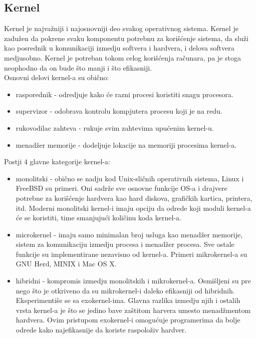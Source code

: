 \subsection{Kernel}
Kernel je najvažniji i najosnovniji deo svakog operativnog sistema. Kernel je zadužen da pokrene svaku komponentu potrebnu za korišćenje sistema, da služi kao posrednik u komunikaciji izmedju softvera i hardvera, i delova softvera medjusobno. Kernel je potreban tokom celog korišćenja računara, pa je stoga neophodno da on bude što manji i što efikasniji.\\
Osnovni delovi kernel-a su obično:
\begin{itemize}
\item rasporednik - odredjuje kako će razni procesi koristiti snagu procesora.
\item supervizor - odobrava kontrolu kompjutera procesu koji je na redu.
\item rukovodilac zahteva - rukuje svim zahtevima upućenim kernel-u.
\item menadžer memorije - dodeljuje lokacije na memoriji procesima kernel-a.
\end{itemize}
Postji 4 glavne kategorije kernel-a:
\begin{itemize}
\item monolitski - obično se nadju kod Unix-sličnih operativnih sistema, Linux i FreeBSD su primeri. Oni sadrže sve osnovne funkcije OS-a i drajvere potrebne za korišćenje hardvera kao hard diskova, grafičkih kartica, printera, itd. Moderni monolitski kernel-i imaju opciju da odrede koji moduli kernel-a će se koristiti, time smanjujući količinu koda kernel-a.
\item microkernel - imaju samo minimalan broj usluga kao menadžer memorije, sistem za komunikaciju izmedju procesa i menadžer procesa. Sve ostale funkcije su implementirane nezavisno od kernel-a. Primeri mikrokernel-a su GNU Herd, MINIX i Mac OS X.
\item hibridni - kompromis izmedju monolitskih i mikrokernel-a. Osmišljeni su pre nego što je otkriveno da su mikrokernel-i daleko efikasniji od hibridnih.\\
Eksperimentiše se sa exokernel-ima. Glavna razlika izmedju njih i ostalih vrsta kernel-a je što se jedino bave zaštitom harvera umesto menadžmentom hardvera. Ovim pristupom exokernel-i omogućuje programerima da bolje odrede kako najefikasnije da koriste raspoloživ hardver.
\end{itemize}
\newpage
